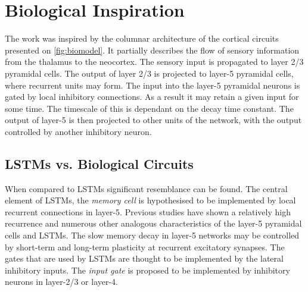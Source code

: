 \section{Biological Inspiration}
The work was inspired by the columnar architecture of the cortical circuits presented on \figurename{\ref{fig:biomodel}}. It partially describes the flow of sensory information from the thalamus to the neocortex. The sensory input is propagated to layer 2/3 pyramidal cells. The output of layer 2/3 is projected to layer-5 pyramidal cells, where recurrent units may form. The input into the layer-5 pyramidal neurons is gated by local inhibitory connections. As a result it may retain a given input for some time. The timescale of this is dependant on the decay time constant. The output of layer-5 is then projected to other units of the network, with the output controlled by another inhibitory neuron.


\subsection{LSTMs vs. Biological Circuits}
When compared to LSTMs significant resemblance can be found. The central element of LSTMs, the \textit{memory cell} is hypothesised to be implemented by local recurrent connections in layer-5. Previous studies have shown a relatively high recurrence and numerous other analogous characteristics of the layer-5 pyramidal cells and LSTMs. \cite{douglas_koch_mahowald_martin_suarez_1995, thomson_2002, kerkoerle_self_roelfsema_2017, goldman-rakic_1995} The slow memory decay in layer-5 networks may be controlled by short-term and long-term plasticity at recurrent excitatory synapses. \cite{abbott_nelson_2000} The gates that are used by LSTMs are thought to be implemented by the lateral inhibitory inputs. The \textit{input gate} is proposed to be implemented by inhibitory neurons in layer-2/3 or layer-4.

